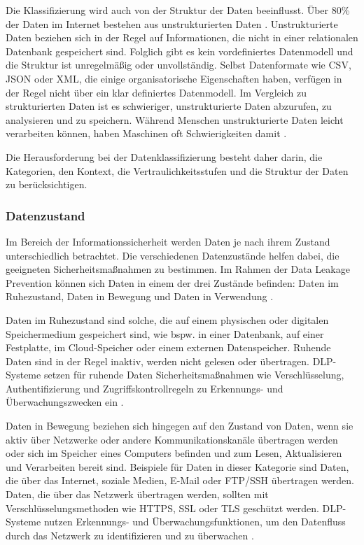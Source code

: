 Die Klassifizierung wird auch von der Struktur der Daten beeinflusst. Über 80\% der Daten im Internet bestehen aus unstrukturierten Daten \cite{Allahyari.2017}. Unstrukturierte Daten beziehen sich in der Regel auf Informationen, die nicht in einer relationalen Datenbank gespeichert sind. Folglich gibt es kein vordefiniertes Datenmodell und die Struktur ist unregelmäßig oder unvollständig. Selbst Datenformate wie CSV, JSON oder XML, die einige organisatorische Eigenschaften haben, verfügen in der Regel nicht über ein klar definiertes Datenmodell. Im Vergleich zu strukturierten Daten ist es schwieriger, unstrukturierte Daten abzurufen, zu analysieren und zu speichern. Während Menschen unstrukturierte Daten leicht verarbeiten können, haben Maschinen oft Schwierigkeiten damit \cite{Guo.2021}.

Die Herausforderung bei der Datenklassifizierung besteht daher darin, die Kategorien, den Kontext, die Vertraulichkeitsstufen und die Struktur der Daten zu berücksichtigen.

\subsubsection{Datenzustand}
Im Bereich der Informationssicherheit werden Daten je nach ihrem Zustand unterschiedlich betrachtet. Die verschiedenen Datenzustände helfen dabei, die geeigneten Sicherheitsmaßnahmen zu bestimmen. Im Rahmen der Data Leakage Prevention können sich Daten in einem der drei Zustände befinden: Daten im Ruhezustand, Daten in Bewegung und Daten in Verwendung \cite{Shabtai.2012b}.

Daten im Ruhezustand sind solche, die auf einem physischen oder digitalen Speichermedium gespeichert sind, wie bspw. in einer Datenbank, auf einer Festplatte, im Cloud-Speicher oder einem externen Datenspeicher. Ruhende Daten sind in der Regel inaktiv, werden nicht gelesen oder übertragen. DLP-Systeme setzen für ruhende Daten Sicherheitsmaßnahmen wie Verschlüsselung, Authentifizierung und Zugriffskontrollregeln zu Erkennungs- und Überwachungszwecken ein \cite{Shabtai.2012b}\cite{Shishodia.2022}.

Daten in Bewegung beziehen sich hingegen auf den Zustand von Daten, wenn sie aktiv über Netzwerke oder andere Kommunikationskanäle übertragen werden oder sich im Speicher eines Computers befinden und zum Lesen, Aktualisieren und Verarbeiten bereit sind. Beispiele für Daten in dieser Kategorie sind Daten, die über das Internet, soziale Medien, E-Mail oder FTP/SSH übertragen werden. Daten, die über das Netzwerk übertragen werden, sollten mit Verschlüsselungsmethoden wie HTTPS, SSL oder TLS geschützt werden. DLP-Systeme nutzen Erkennungs- und Überwachungsfunktionen, um den Datenfluss durch das Netzwerk zu identifizieren und zu überwachen \cite{Shabtai.2012b}\cite{Shishodia.2022}.


